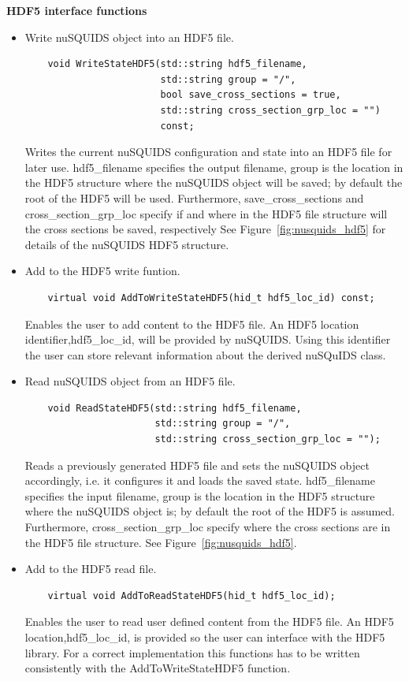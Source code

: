\documentclass[3p,12pt]{elsarticle}
\newcommand{\ttf}{\ttfamily}
\begin{document}
\textbf{HDF5 interface functions}
 
\begin{itemize}
  \item Write nuSQUIDS object into an HDF5 file.
  \begin{lstlisting}
    void WriteStateHDF5(std::string hdf5_filename,
                        std::string group = "/",
                        bool save_cross_sections = true, 
                        std::string cross_section_grp_loc = "")
                        const;
  \end{lstlisting}
  Writes the current {\ttf nuSQUIDS} configuration and state into an HDF5 file
  for later use. {\ttf hdf5\_filename} specifies the output filename, {\ttf group} is the
  location in the HDF5 structure where the {\ttf nuSQUIDS} object will be saved; by default
  the root of the HDF5 will be used. Furthermore, {\ttf
  save\_cross\_sections} and {\ttf cross\_section\_grp\_loc}
  specify if and where in the HDF5 file structure will the cross sections be saved, respectively
   See Figure~\ref{fig:nusquids_hdf5} for details of the nuSQUIDS HDF5 structure.
  \item Add to the HDF5 write funtion.
  \begin{lstlisting}
    virtual void AddToWriteStateHDF5(hid_t hdf5_loc_id) const;
  \end{lstlisting}
  Enables the user to add content to the HDF5 file. An HDF5
    location identifier,{\ttf hdf5\_loc\_id}, will be provided by {\ttf nuSQUIDS}. Using this
    identifier the user can store relevant
  information about the derived nuSQuIDS class.
  \item Read nuSQUIDS object from an HDF5 file.
    \begin{lstlisting}
    void ReadStateHDF5(std::string hdf5_filename,
                       std::string group = "/",
                       std::string cross_section_grp_loc = "");
  \end{lstlisting}
  Reads a previously generated HDF5 file and sets the {\ttf nuSQUIDS} object
  accordingly, i.e. it configures it and loads the saved state. {\ttf
    hdf5\_filename} specifies the input filename, {\ttf group} is the
  location in the HDF5 structure where the {\ttf nuSQUIDS} object is;
  by default the root of the HDF5 is assumed. Furthermore, {\ttf
    cross\_section\_grp\_loc} specify where the cross sections are in
  the HDF5 file structure. See Figure~\ref{fig:nusquids_hdf5}. 
  \item Add to the HDF5 read file.
  \begin{lstlisting}
    virtual void AddToReadStateHDF5(hid_t hdf5_loc_id);
  \end{lstlisting}
  Enables the user to read user defined content from the HDF5 file. An
  HDF5 location,{\ttf hdf5\_loc\_id}, is provided so the user can
  interface with the HDF5 library. For a correct implementation this
  functions has to be written consistently with the {\ttf
    AddToWriteStateHDF5} function.
\end{itemize}
\end{document}
